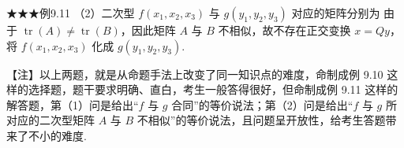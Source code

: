 \begin{fcard}{★★★例9.11}
（2）二次型 $f(x_1,x_2,x_3)$ 与 $g(y_1,y_2,y_3)$ 对应的矩阵分别为
由于 $\operatorname{tr}(A)\ne\operatorname{tr}(B)$，因此矩阵 $A$ 与 $B$ 不相似，故不存在正交变换 $x=Qy$，将 $f(x_1,x_2,x_3)$ 化成 $g(y_1,y_2,y_3)$.
\end{fcard}

\begin{fnote}
【注】以上两题，就是从命题手法上改变了同一知识点的难度，命制成例 9.10 这样的选择题，题干要求明确、直白，考生一般答得很好，但命制成例 9.11 这样的解答题，第（1）问是给出“$f$ 与 $g$ 合同”的等价说法；第（2）问是给出“$f$ 与 $g$ 所对应的二次型矩阵 $A$ 与 $B$ 不相似”的等价说法，且问题呈开放性，给考生答题带来了不小的难度.
\end{fnote}


